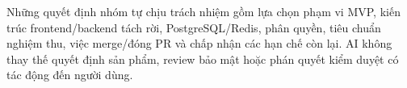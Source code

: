 Những quyết định nhóm tự chịu trách nhiệm gồm lựa chọn phạm vi MVP, kiến trúc frontend/backend tách rời, PostgreSQL/Redis, phân quyền, tiêu chuẩn nghiệm thu, việc merge/đóng PR và chấp nhận các hạn chế còn lại. AI không thay thế quyết định sản phẩm, review bảo mật hoặc phán quyết kiểm duyệt có tác động đến người dùng.

